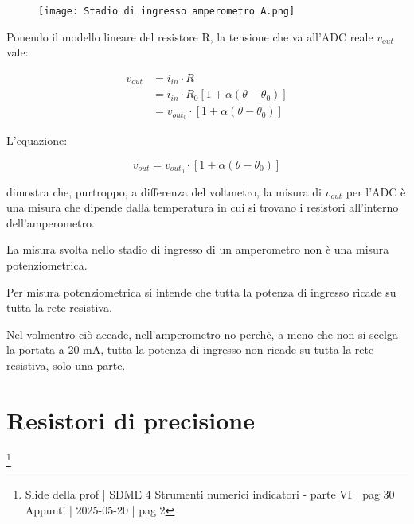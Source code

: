 \begin{figure}[h]
    \centering
    \texttt{[image: Stadio di ingresso amperometro A.png]}
\end{figure}

Ponendo il modello lineare del resistore R, 
la tensione che va all'ADC reale $v_{out}$ vale: 

{
    \Large 
    \begin{equation}
        \begin{split}
        v_{out}
        &= 
        i_{in}
        \cdot 
        R
        \\
        &= 
        i_{in}
        \cdot 
        R_0 [1 + \alpha (\theta - \theta_0)] 
        \\
        &= 
        v_{out_0}
        \cdot 
        [1 + \alpha (\theta - \theta_0)]
        \end{split}
        \end{equation}
}

L'equazione: 

{
    \Large 
    \begin{equation}
      v_{out}
        =  
        v_{out_0}
        \cdot 
        [1 + \alpha (\theta - \theta_0)]
    \end{equation}
}

dimostra che, purtroppo, a differenza del voltmetro, la misura di $v_{out}$ per l'ADC 
è una misura che dipende dalla temperatura in cui si trovano i resistori all'interno dell'amperometro. \newline 

La misura svolta nello stadio di ingresso di un amperometro non è una misura potenziometrica. \newline 

Per misura potenziometrica si intende che tutta la potenza di ingresso ricade su tutta la rete resistiva. \newline 

Nel volmentro ciò accade, nell'amperometro no perchè, a meno che non si scelga la portata a 20 mA, 
tutta la potenza di ingresso non ricade su tutta la rete resistiva, solo una parte. \newline 

\newpage

\section{Resistori di precisione}
\footnote{Slide della prof | SDME 4 Strumenti numerici indicatori - parte VI | pag 30 \\  
Appunti | 2025-05-20 | pag 2}

